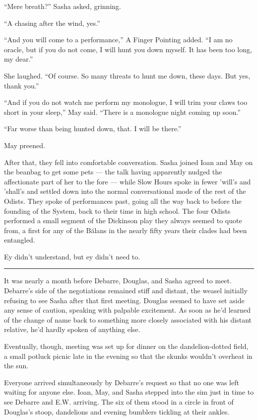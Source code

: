 ``Mere breath?'' Sasha asked, grinning.

``A chasing after the wind, yes.''

``And you will come to a performance,'' A Finger Pointing added. ``I am no oracle, but if you do not come, I will hunt you down myself. It has been too long, my dear.''

She laughed. ``Of course. So many threats to hunt me down, these days. But yes, thank you.''

``And if you do not watch me perform my monologue, I will trim your claws too short in your sleep,'' May said. ``There is a monologue night coming up soon.''

``Far worse than being hunted down, that. I will be there.''

May preened.

After that, they fell into comfortable conversation. Sasha joined Ioan and May on the beanbag to get some pets — the talk having apparently nudged the affectionate part of her to the fore — while Slow Hours spoke in fewer 'will's and 'shall's and settled down into the normal conversational mode of the rest of the Odists. They spoke of performances past, going all the way back to before the founding of the System, back to their time in high school. The four Odists performed a small segment of the Dickinson play they always seemed to quote from, a first for any of the Bălans in the nearly fifty years their clades had been entangled.

Ey didn't understand, but ey didn't need to.

\begin{center}\rule{0.5\linewidth}{0.5pt}\end{center}

It was nearly a month before Debarre, Douglas, and Sasha agreed to meet. Debarre's side of the negotiations remained stiff and distant, the weasel initially refusing to see Sasha after that first meeting. Douglas seemed to have set aside any sense of caution, speaking with palpable excitement. As soon as he'd learned of the change of name back to something more closely associated with his distant relative, he'd hardly spoken of anything else.

Eventually, though, meeting was set up for dinner on the dandelion-dotted field, a small potluck picnic late in the evening so that the skunks wouldn't overheat in the sun.

Everyone arrived simultaneously by Debarre's request so that no one was left waiting for anyone else. Ioan, May, and Sasha stepped into the sim just in time to see Debarre and E.W. arriving. The six of them stood in a circle in front of Douglas's stoop, dandelions and evening bumblers tickling at their ankles.

